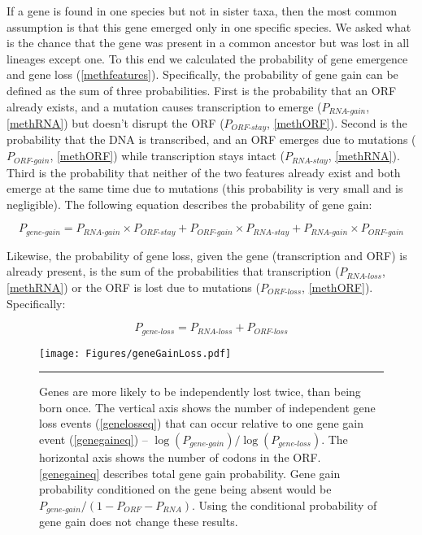 \documentclass[12pt,a4paper]{article}
\begin{document}
If a gene is found in one species but not in sister taxa, then the most common assumption is that this gene emerged only in one specific species. We asked what is the chance that the gene was present in a common ancestor but was lost in all lineages except one. To this end we calculated the probability of gene emergence and gene loss (\autoref{methfeatures}). Specifically, the probability of gene gain can be defined as the sum of three probabilities. First is the probability that an ORF already exists, and a mutation causes transcription to emerge ($P_\textit{RNA-gain}$, \autoref{methRNA}) but doesn't disrupt the ORF ($P_\textit{ORF-stay}$, \autoref{methORF}). Second is the probability that the DNA is transcribed, and an ORF emerges due to mutations ($P_\textit{ORF-gain}$, \autoref{methORF}) while transcription stays intact ($P_\textit{RNA-stay}$, \autoref{methRNA}). Third is the probability that neither of the two features already exist and both emerge at the same time due to mutations (this probability is very small and is negligible). The following equation describes the probability of gene gain:

\begin{equation}
P_\textit{gene-gain} = P_\textit{RNA-gain} \times P_\textit{ORF-stay} + P_\textit{ORF-gain} \times P_\textit{RNA-stay} + P_\textit{RNA-gain}\times P_\textit{ORF-gain}
\label{genegaineq}
\end{equation}

Likewise, the probability of gene loss, given the gene (transcription and ORF) is already present, is the sum of the probabilities that transcription ($P_\textit{RNA-loss}$, \autoref{methRNA}) or the ORF is lost due to mutations ($P_\textit{ORF-loss}$, \autoref{methORF}). Specifically:

\begin{equation}
P_\textit{gene-loss} = P_\textit{RNA-loss} + P_\textit{ORF-loss}
\label{genelosseq}
\end{equation}

\begin{figure}[!t]
\centering
\texttt{[image: Figures/geneGainLoss.pdf]}
\caption{Genes are more likely to be independently lost twice, than being born once. The vertical axis shows the number of independent gene loss events (\autoref{genelosseq}) that can occur relative to one gene gain event (\autoref{genegaineq}) -- $\log(P_\textit{gene-gain})/\log(P_\textit{gene-loss})$. The horizontal axis shows the number of codons in the ORF. \autoref{genegaineq} describes total gene gain probability. Gene gain probability conditioned on the gene being absent would be $P_\textit{gene-gain}/(1-P_\textit{ORF} - P_\textit{RNA})$. Using the conditional probability of gene gain does not change these results.}
\label{gainlossprob}
\vspace{1ex}
\hrule
\end{figure}
\end{document}
